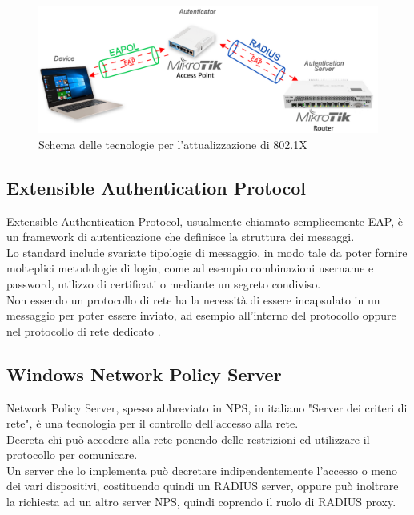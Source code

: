 \documentclass[Tesi.tex]{subfiles}
\begin{document}
\begin{figure}[H]
	\centering
	\includegraphics[width=1\linewidth]{"images/Schema_tecnologie"}
	\caption{Schema delle tecnologie per l'attualizzazione di 802.1X}
	\label{fig:Schema delle tecnologie per l'attualizzazione di 802.1X}
\end{figure}

\subsection{Extensible Authentication Protocol}
Extensible Authentication Protocol, usualmente chiamato semplicemente EAP, è un framework di autenticazione che definisce la struttura dei messaggi. \\
Lo standard include svariate tipologie di messaggio, in modo tale da poter fornire molteplici metodologie di login, come ad esempio combinazioni username e password, utilizzo di certificati o mediante un segreto condiviso. \\
Non essendo un protocollo di rete ha la necessità di essere incapsulato in un messaggio per poter essere inviato, ad esempio all'interno del protocollo  oppure nel protocollo di rete dedicato .

\subsection{Windows Network Policy Server}
Network Policy Server, spesso abbreviato in NPS, in italiano "Server dei criteri di rete", è una tecnologia per il controllo dell'accesso alla rete. \\
Decreta chi può accedere alla rete ponendo delle restrizioni ed utilizzare il protocollo  per comunicare. \\
Un server che lo implementa può decretare indipendentemente l'accesso o meno dei vari dispositivi, costituendo quindi un RADIUS server, oppure può inoltrare la richiesta ad un altro server NPS, quindi coprendo il ruolo di RADIUS proxy.
\end{document}
